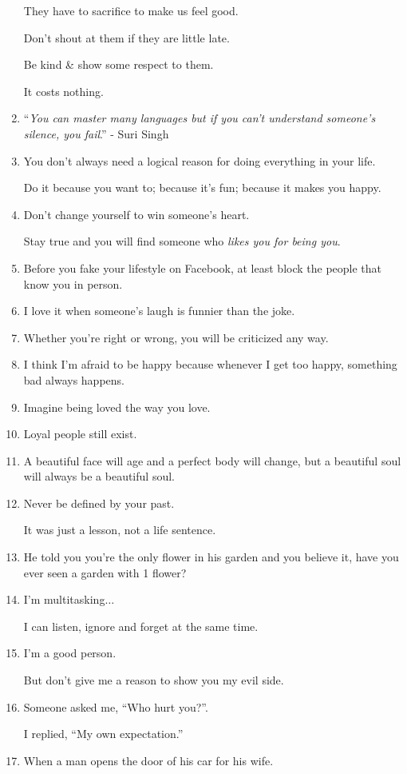 \documentclass{article}
\begin{document}
\begin{enumerate}
	They have to sacrifice to make us feel good.
	
	Don't shout at them if they are little late.
	
	Be kind \& show some respect to them.
	
	It costs nothing.
	\item ``\textit{You can master many languages but if you can't understand someone's silence, you fail}.'' - Suri Singh
	\item You don't always need a logical reason for doing everything in your life.
	
	Do it because you want to; because it's fun; because it makes you happy.
	\item Don't change yourself to win someone's heart.
	
	Stay true and you will find someone who \textit{likes you for being you}.
	\item Before you fake your lifestyle on Facebook, at least block the people that know you in person.
	\item I love it when someone's laugh is funnier than the joke.
	\item Whether you're right or wrong, you will be criticized any way.
	\item I think I'm afraid to be happy because whenever I get too happy, something bad always happens.
	\item Imagine being loved the way you love.
	\item Loyal people still exist.
	\item A beautiful face will age and a perfect body will change, but a beautiful soul will always be a beautiful soul.
	\item Never be defined by your past.
	
	It was just a lesson, not a life sentence.
	\item He told you you're the only flower in his garden and you believe it, have you ever seen a garden with 1 flower?
	\item I'm multitasking$\ldots$
	
	I can listen, ignore and forget at the same time.
	\item I'm a good person.
	
	But don't give me a reason to show you my evil side.
	\item Someone asked me, ``Who hurt you?''.
	
	I replied, ``My own expectation.''
	\item When a man opens the door of his car for his wife.
	

\end{enumerate}
\end{document}
